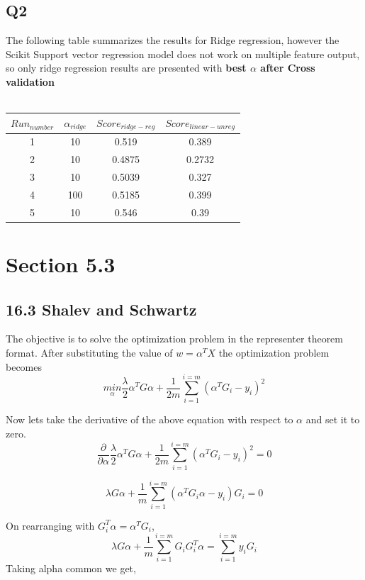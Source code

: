 \subsection{Q2}
The following table summarizes the results for Ridge regression, however the Scikit Support vector regression model
does not work on multiple feature output, so only ridge regression results are presented with \textbf{best $\alpha$ after Cross validation}
\\
\\
\begin{tabular}{c | c | c | c  }
    $Run_{number}$  & $\alpha_{ridge}$ & $Score_{ridge-reg}$  & $Score_{linear-unreg}$ 
     \\ \hline
    1 & 10 & 0.519 & 0.389 
     \\ \hline
    2 & 10 & 0.4875 & 0.2732 
     \\ \hline
    3 & 10 & 0.5039 & 0.327
    \\ \hline
    4 & 100 & 0.5185 & 0.399
    \\ \hline
    5 & 10 & 0.546 & 0.39 
    \\ \hline
\end{tabular}

\section{Section 5.3}
\subsection{16.3 Shalev and Schwartz}
\normalfont The objective is to solve the optimization problem in the representer theorem format.
After substituting the value of $w = \alpha^TX$ the optimization problem becomes
$$
    \underset{\alpha}{min} \frac{\lambda}{2}\alpha^T G \alpha + \frac{1}{2m}\sum_{i =1}^{i=m}(\alpha^TG_i - y_i)^2
$$

Now lets take the derivative of the above equation with respect to $\alpha$ and set it to zero.
$$
    \frac{\partial}{\partial \alpha} \frac{\lambda}{2}\alpha^T G \alpha + \frac{1}{2m}\sum_{i =1}^{i=m}(\alpha^TG_i - y_i)^2 = 0
$$

$$
    {\lambda}G \alpha   +  \frac{1}{m}\sum_{i = 1}^{i=m} (\alpha^TG_i\alpha - y_i)G_i =  0
$$

On rearranging with $G_i^T \alpha = \alpha^T G_i$,
$$
    {\lambda}G \alpha  + \frac{1}{m}\sum_{i = 1}^{i=m} G_i G_i^T \alpha  =  \sum_{i = 1}^{i=m}y_i G_i
$$
Taking alpha common we get,

